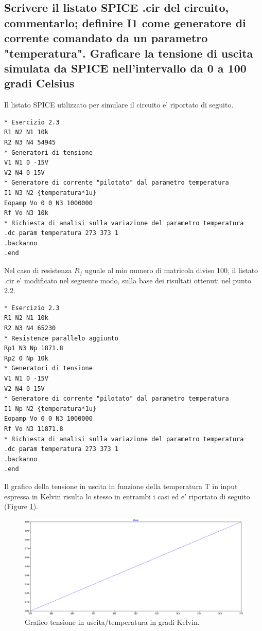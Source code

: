 \documentclass[a4paper,10pt]{article}
\begin{document}
\subsection{Scrivere il listato SPICE .cir del circuito, commentarlo; definire I1 come generatore di corrente comandato da un parametro "temperatura". Graficare la tensione di uscita simulata da SPICE nell'intervallo da 0 a 100 gradi Celsius}
Il listato SPICE utilizzato per simulare il circuito e' riportato di seguito.
\small
\begin{verbatim}
* Esercizio 2.3
R1 N2 N1 10k
R2 N3 N4 54945
* Generatori di tensione
V1 N1 0 -15V
V2 N4 0 15V
* Generatore di corrente "pilotato" dal parametro temperatura
I1 N3 N2 {temperatura*1u}
Eopamp Vo 0 0 N3 1000000
Rf Vo N3 10k
* Richiesta di analisi sulla variazione del parametro temperatura
.dc param temperatura 273 373 1
.backanno
.end
\end{verbatim}
\normalsize
Nel caso di resistenza $R_f$ uguale al mio numero di matricola diviso 100, il listato .cir e' modificato nel seguente modo, sulla base dei risultati ottenuti nel punto 2.2.
\small
\begin{verbatim}
* Esercizio 2.3
R1 N2 N1 10k
R2 N3 N4 65230
* Resistenze parallelo aggiunto
Rp1 N3 Np 1871.8
Rp2 0 Np 10k
* Generatori di tensione
V1 N1 0 -15V
V2 N4 0 15V
* Generatore di corrente "pilotato" dal parametro temperatura
I1 Np N2 {temperatura*1u}
Eopamp Vo 0 0 N3 1000000
Rf Vo N3 11871.8
* Richiesta di analisi sulla variazione del parametro temperatura
.dc param temperatura 273 373 1
.backanno
.end
\end{verbatim} 
\normalsize
Il grafico della tensione in uscita in funzione della temperatura T in input espressa in Kelvin risulta lo stesso in entrambi i casi ed e' riportato di seguito (Figure \ref{fig:tensionetemper}). 
\begin{figure}[h!]
	\centering
 	\includegraphics[width=0.7\linewidth]{plot1-2-5.png}
  	\caption{Grafico tensione in uscita/temperatura in gradi Kelvin.}
  	\label{fig:tensionetemper}
\end{figure}


\pagebreak
\end{document}
